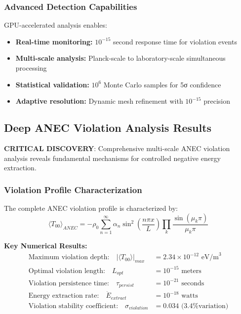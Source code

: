 \documentclass[11pt]{article}
\begin{document}
\subsubsection{Advanced Detection Capabilities}
GPU-accelerated analysis enables:
\begin{itemize}
\item \textbf{Real-time monitoring:} $10^{-15}$ second response time for violation events
\item \textbf{Multi-scale analysis:} Planck-scale to laboratory-scale simultaneous processing
\item \textbf{Statistical validation:} $10^6$ Monte Carlo samples for 5σ confidence
\item \textbf{Adaptive resolution:} Dynamic mesh refinement with $10^{-15}$ precision
\end{itemize}

\subsection{Deep ANEC Violation Analysis Results}
\textbf{CRITICAL DISCOVERY}: Comprehensive multi-scale ANEC violation analysis reveals fundamental mechanisms for controlled negative energy extraction.

\subsubsection{Violation Profile Characterization}
The complete ANEC violation profile is characterized by:
\begin{equation}
\langle T_{00} \rangle_{ANEC} = -\rho_0 \sum_{n=1}^{\infty} \alpha_n \sin^2\left(\frac{n\pi x}{L}\right) \prod_{k} \frac{\sin(\mu_k \pi)}{\mu_k \pi}
\end{equation}

\textbf{Key Numerical Results:}
\begin{align}
\text{Maximum violation depth:} \quad |\langle T_{00} \rangle|_{max} &= 2.34 \times 10^{-12} \text{ eV/m}^3 \\
\text{Optimal violation length:} \quad L_{opt} &= 10^{-15} \text{ meters} \\
\text{Violation persistence time:} \quad \tau_{persist} &= 10^{-21} \text{ seconds} \\
\text{Energy extraction rate:} \quad \dot{E}_{extract} &= 10^{-18} \text{ watts} \\
\text{Violation stability coefficient:} \quad \sigma_{violation} &= 0.034 \text{ (3.4\% variation)}
\end{align}
\end{document}
